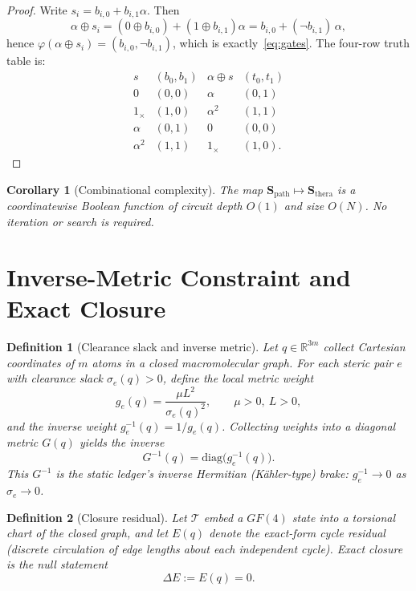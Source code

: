 \documentclass[11pt,a4paper]{article}
\newtheorem{definition}{Definition}
\newtheorem{corollary}{Corollary}
\begin{document}
\begin{proof}
Write \(s_i=b_{i,0}+b_{i,1}\alpha\). Then
\[
  \alpha\oplus s_i
  =(0\oplus b_{i,0})+(1\oplus b_{i,1})\alpha
  =b_{i,0}+(\neg b_{i,1})\,\alpha,
\]
hence \(\varphi(\alpha\oplus s_i)=(b_{i,0},\neg b_{i,1})\), which is
exactly~\eqref{eq:gates}. The four-row truth table is:
\[
\begin{array}{c|cc|c}
s & (b_0,b_1) & \alpha\oplus s & (t_0,t_1)\\
\hline
0 & (0,0) & \alpha & (0,1)\\
1_{\times} & (1,0) & \alpha^2 & (1,1)\\
\alpha & (0,1) & 0 & (0,0)\\
\alpha^2 & (1,1) & 1_{\times} & (1,0).
\end{array}
\]
\end{proof}

\begin{corollary}[Combinational complexity]
The map \(\mathbf{S}_{\mathrm{path}}\mapsto\mathbf{S}_{\mathrm{thera}}\) is a
coordinatewise Boolean function of circuit depth \(O(1)\) and size \(O(N)\).
No iteration or search is required.
\end{corollary}

\section{Inverse-Metric Constraint and Exact Closure}

\begin{definition}[Clearance slack and inverse metric]
Let \(q\in\mathbb{R}^{3m}\) collect Cartesian coordinates of \(m\) atoms in a
closed macromolecular graph. For each steric pair \(e\) with clearance
slack \(\sigma_e(q)>0\), define the local metric weight
\begin{equation}
  g_e(q)=\frac{\mu L^2}{\sigma_e(q)^2},\qquad
  \mu>0,\ L>0,
\end{equation}
and the inverse weight \(g_e^{-1}(q)=1/g_e(q)\). Collecting weights into a
diagonal metric \(G(q)\) yields the inverse
\begin{equation}
  G^{-1}(q)=\mathrm{diag}\bigl(g_e^{-1}(q)\bigr).
\end{equation}
This \(G^{-1}\) is the static ledger's inverse Hermitian (K\"ahler-type)
brake: \(g_e^{-1}\to 0\) as \(\sigma_e\to 0\).
\end{definition}

\begin{definition}[Closure residual]
Let \(\mathcal{T}\) embed a \(GF(4)\) state into a torsional chart of the
closed graph, and let \(E(q)\) denote the exact-form cycle residual
(discrete circulation of edge lengths about each independent cycle).
Exact closure is the null statement
\begin{equation}
  \label{eq:deltaE}
  \Delta E := E(q)=0.
\end{equation}
\end{definition}
\end{document}
